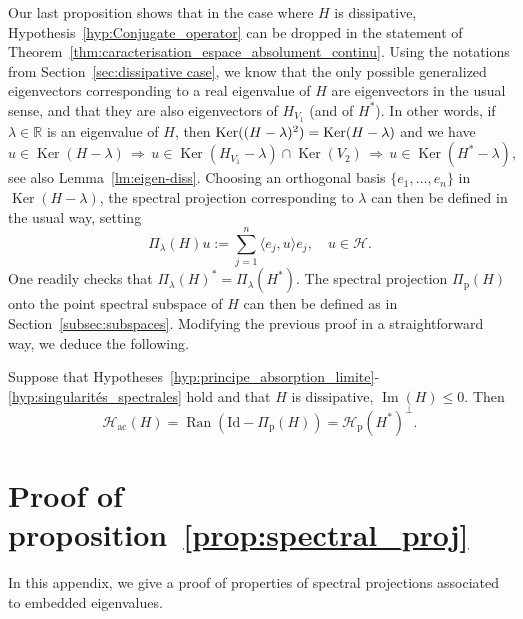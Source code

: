 \documentclass[AHL,Unicode,longabstracts,published]{cedram}
\newcommand{\Hi}{\mathcal{H}}
\newcommand{\R}{\mathbb{R}}
\newcommand{\rmp}{\mathrm{p}}
\newcommand{\acr}{\mathrm{ac}}
\DeclareMathOperator{\Ran}{Ran}
\DeclareMathOperator{\Ker}{Ker}
\DeclareMathOperator{\im}{Im}
\newcommand{\Hi}{\mathcal{H}}
\newcommand{\rmp}{\mathrm{p}}
\newcommand{\R}{\mathbb{R}}
\DeclareMathOperator{\im}{Im}
\newcommand{\acr}{\mathrm{ac}}
\begin{document}
Our last proposition shows that in the case where $H$ is dissipative, Hypothesis~\ref{hyp:Conjugate_operator} can be dropped in the statement of Theorem~\ref{thm:caracterisation_espace_absolument_continu}. Using the notations from Section~\ref{sec:dissipative case}, we know that the only possible generalized eigenvectors corresponding to a real eigenvalue of $H$ are eigenvectors in the usual sense, and that they are also eigenvectors of $H_{V_1}$ (and of $H^*$). In other words, if $\lambda\in\R$ is an eigenvalue of $H$, then $\Ker((H-\lambda)^2)\linebreak=\Ker(H-\lambda)$ and we have
\begin{equation*}
u\in\Ker(H-\lambda)\,\Rightarrow\,u\in\Ker(H_{V_1}-\lambda)\cap\Ker(V_2)\,\Rightarrow\,u\in\Ker(H^*-\lambda),
\end{equation*}
see also Lemma~\ref{lm:eigen-diss}. Choosing an orthogonal basis $\{e_1,\dots,e_n\}$ in $\Ker(H-\lambda)$, the spectral projection corresponding to $\lambda$ can then be defined in the usual way, setting
\begin{equation*}
\Pi_\lambda(H)u:=\sum_{j=1}^n\langle e_j,u\rangle e_j, \quad u\in\Hi.
\end{equation*}
One readily checks that $\Pi_\lambda(H)^*=\Pi_\lambda(H^*)$. The spectral projection $\Pi_{\rmp}(H)$ onto the point spectral subspace of $H$ can then be defined as in Section~\ref{subsec:subspaces}. Modifying the previous proof in a straightforward way, we deduce the following.

\begin{prop}\label{prop:ac-diss}
Suppose that Hypotheses~\ref{hyp:principe_absorption_limite}-\ref{hyp:singularités_spectrales} hold and that $H$ is dissipative, $\im(H)\le 0$. Then
\begin{equation*}
\Hi_\acr(H)=\Ran(\mathrm{Id}-\Pi_\rmp(H))=\Hi_\rmp(H^*)^\perp.
\end{equation*}
\end{prop}


\appendix

\section{Proof of proposition~\ref{prop:spectral_proj}}\label{App:proof projection embedded}

In this appendix, we give a proof of properties of spectral projections associated to embedded eigenvalues.
\end{document}
